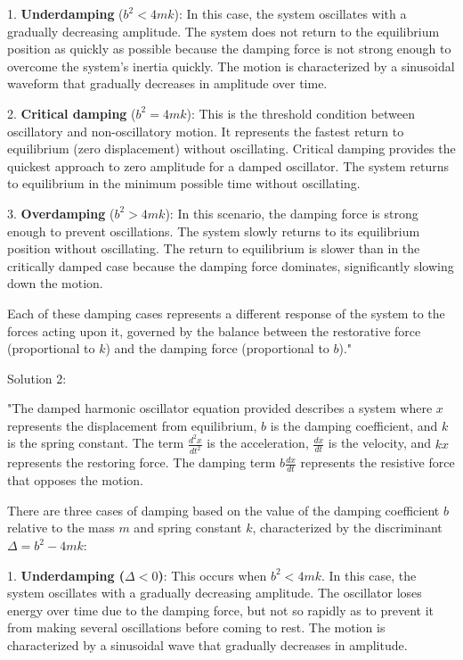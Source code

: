 1. \textbf{Underdamping} (\(b^2 < 4mk\)): In this case, the system oscillates with a gradually decreasing amplitude. The system does not return to the equilibrium position as quickly as possible because the damping force is not strong enough to overcome the system's inertia quickly. The motion is characterized by a sinusoidal waveform that gradually decreases in amplitude over time.

2. \textbf{Critical damping} (\(b^2 = 4mk\)): This is the threshold condition between oscillatory and non-oscillatory motion. It represents the fastest return to equilibrium (zero displacement) without oscillating. Critical damping provides the quickest approach to zero amplitude for a damped oscillator. The system returns to equilibrium in the minimum possible time without oscillating.

3. \textbf{Overdamping} (\(b^2 > 4mk\)): In this scenario, the damping force is strong enough to prevent oscillations. The system slowly returns to its equilibrium position without oscillating. The return to equilibrium is slower than in the critically damped case because the damping force dominates, significantly slowing down the motion.

Each of these damping cases represents a different response of the system to the forces acting upon it, governed by the balance between the restorative force (proportional to \(k\)) and the damping force (proportional to \(b\))."

Solution 2:

"The damped harmonic oscillator equation provided describes a system where \(x\) represents the displacement from equilibrium, \(b\) is the damping coefficient, and \(k\) is the spring constant. The term \(\frac{d^2x}{dt^2}\) is the acceleration, \(\frac{dx}{dt}\) is the velocity, and \(kx\) represents the restoring force. The damping term \(b\frac{dx}{dt}\) represents the resistive force that opposes the motion.

There are three cases of damping based on the value of the damping coefficient \(b\) relative to the mass \(m\) and spring constant \(k\), characterized by the discriminant \(\Delta = b^2 - 4mk\):

1. \textbf{Underdamping (\(\Delta < 0\))}: This occurs when \(b^2 < 4mk\). In this case, the system oscillates with a gradually decreasing amplitude. The oscillator loses energy over time due to the damping force, but not so rapidly as to prevent it from making several oscillations before coming to rest. The motion is characterized by a sinusoidal wave that gradually decreases in amplitude.

